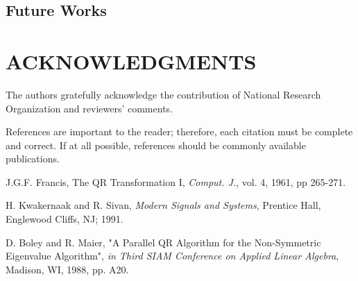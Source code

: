\documentclass[a4paper, 10pt, conference]{ieeeconf}      %
\begin{document}
\subsection{Future Works}

\section{ACKNOWLEDGMENTS}

The authors gratefully acknowledge the contribution of National Research Organization and reviewers' comments.



References are important to the reader; therefore, each citation must be complete and correct. If at all possible, references should be commonly available publications.

\begin{thebibliography}{99}

J.G.F. Francis, The QR Transformation I, {\it Comput. J.}, vol. 4, 1961, pp 265-271.

H. Kwakernaak and R. Sivan, {\it Modern Signals and Systems}, Prentice Hall, Englewood Cliffs, NJ; 1991.

D. Boley and R. Maier, "A Parallel QR Algorithm for the Non-Symmetric Eigenvalue Algorithm", {\it in Third SIAM Conference on Applied Linear Algebra}, Madison, WI, 1988, pp. A20.

\end{thebibliography}
\end{document}
